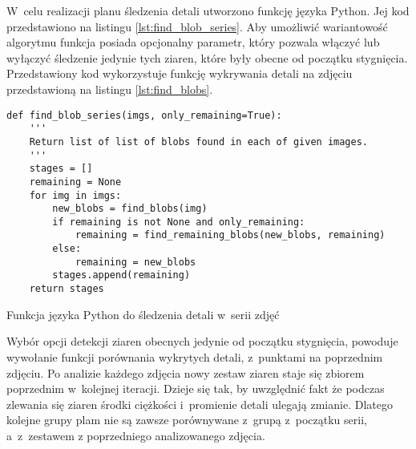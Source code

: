 W~celu realizacji planu śledzenia detali utworzono funkcję języka Python.
Jej kod przedstawiono na listingu \ref{lst:find_blob_series}.
Aby umożliwić wariantowość algorytmu funkcja posiada opcjonalny parametr,
który pozwala włączyć lub wyłączyć śledzenie jedynie tych ziaren, które
były obecne od początku stygnięcia.
Przedstawiony kod wykorzystuje funkcję wykrywania detali na zdjęciu
przedstawioną na listingu \ref{lst:find_blobs}.
\begin{listing}[htb]
\begin{verbatim}
def find_blob_series(imgs, only_remaining=True):
    '''
    Return list of list of blobs found in each of given images.
    '''
    stages = []
    remaining = None
    for img in imgs:
        new_blobs = find_blobs(img)
        if remaining is not None and only_remaining:
            remaining = find_remaining_blobs(new_blobs, remaining)
        else:
            remaining = new_blobs
        stages.append(remaining)
    return stages
\end{verbatim}
\caption{Funkcja języka Python do śledzenia detali w~serii zdjęć}
\label{lst:find_blob_series}
\end{listing}
Wybór opcji detekcji ziaren obecnych jedynie od początku stygnięcia,
powoduje wywołanie funkcji porównania wykrytych detali, z~punktami
na poprzednim zdjęciu.
Po analizie każdego zdjęcia nowy zestaw ziaren staje się zbiorem poprzednim
w~kolejnej iteracji.
Dzieje się tak, by uwzględnić fakt że podczas zlewania się ziaren środki
ciężkości i~promienie detali ulegają zmianie.
Dlatego kolejne grupy plam nie są zawsze porównywane z~grupą z~początku
serii, a~z~zestawem z poprzedniego analizowanego zdjęcia.


